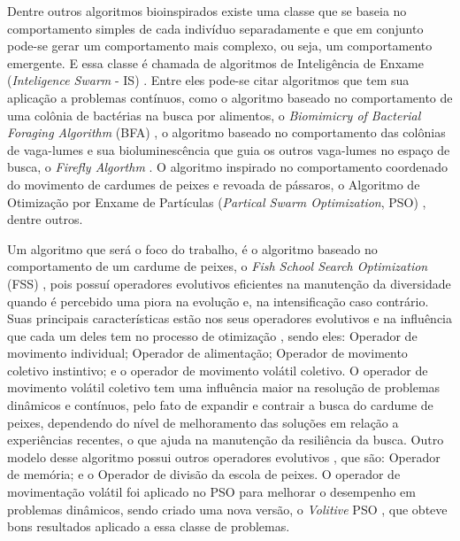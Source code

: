 Dentre outros algoritmos bioinspirados existe uma classe que se baseia no comportamento simples de cada indivíduo separadamente e que em conjunto pode-se gerar um comportamento mais complexo, ou seja, um comportamento emergente. E essa classe é chamada de algoritmos de Inteligência de Enxame (\textit{Inteligence Swarm} - IS) \cite{parpinelli2011new}. Entre eles pode-se citar algoritmos que tem sua aplicação a problemas contínuos, como o algoritmo baseado no comportamento de uma colônia de bactérias na busca por alimentos, o \textit{Biomimicry of Bacterial Foraging Algorithm} (BFA) \cite{passino2002biomimicry}, o algoritmo baseado no comportamento das colônias de vaga-lumes e sua bioluminescência que guia os outros vaga-lumes no espaço de busca, o \textit{Firefly Algorthm} \cite{firefly}. O algoritmo inspirado no comportamento coordenado do movimento de cardumes de peixes e revoada de pássaros, o Algoritmo de Otimização por Enxame de Partículas (\textit{Partical Swarm Optimization}, PSO) \cite{pso}, dentre outros.

Um algoritmo que será o foco do trabalho, é o algoritmo baseado no comportamento de um cardume de peixes, o \textit{Fish School Search Optimization} (FSS) \cite{carmelo2008novel}, pois possuí operadores evolutivos eficientes na manutenção da diversidade quando é percebido uma piora na evolução e, na intensificação caso contrário. Suas principais características estão nos seus operadores evolutivos e na influência que cada um deles tem no processo de otimização \cite{c2009influence}, sendo eles: Operador de movimento individual; Operador de alimentação; Operador de movimento coletivo instintivo; e o operador de movimento volátil coletivo. O operador de movimento volátil coletivo tem uma influência maior na resolução de problemas dinâmicos e contínuos, pelo fato de expandir e contrair a busca do cardume de peixes, dependendo do nível de melhoramento das soluções em relação a experiências recentes, o que ajuda na manutenção da resiliência da busca. Outro modelo desse algoritmo possui outros operadores evolutivos \cite{madeiro2011density}, que são: Operador de memória; e o Operador de divisão da escola de peixes. O operador de movimentação volátil foi aplicado no PSO para melhorar o desempenho em problemas dinâmicos, sendo criado uma nova versão, o \textit{Volitive} PSO \cite{cavalcanti2011hybrid}, que obteve bons resultados aplicado a essa classe de problemas.

